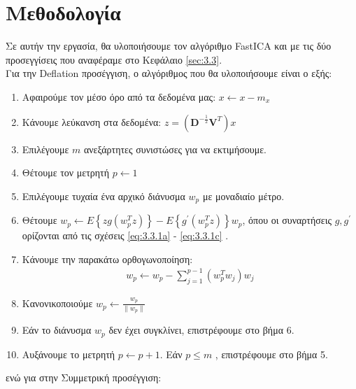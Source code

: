 \section{Μεθοδολογία} \label{sec:3.4}
\justifying
Σε αυτήν την εργασία, θα υλοποιήσουμε τον αλγόριθμο \en FastICA \gr και με τις δύο προσεγγίσεις που αναφέραμε στο Κεφάλαιο
\ref{sec:3.3}. 
\\
Για την \en Deflation \gr προσέγγιση, ο αλγόριθμος που θα υλοποιήσουμε είναι ο εξής:
\begin{enumerate}
    \item Αφαιρούμε τον μέσο όρο από τα δεδομένα μας: \en $x \leftarrow x - m_x $ \gr
    \item Κάνουμε λεύκανση στα δεδομένα: \en $z = \left ( \mathbf{D}^{- \frac{1}{2}} \mathbf{V}^T \right)x $ \gr 
    \item Επιλέγουμε \en $m$ \gr ανεξάρτητες συνιστώσες για να εκτιμήσουμε.
    \item Θέτουμε τον μετρητή \en $p \leftarrow 1$ \gr
    \item Επιλέγουμε τυχαία ένα αρχικό διάνυσμα \en $w_p$ \gr με μοναδιαίο μέτρο.
    \item Θέτουμε \en $w_p \leftarrow E \left \{ z g( w_p^T z) \right \} - E \left \{ g^{'}(w_p^T z) \right \}w_p $, \gr όπου οι συναρτήσεις \en $g, g^{'} $ \gr ορίζονται από τις σχέσεις \en \eqref{eq:3.3.1a} - \eqref{eq:3.3.1c} \gr.
    \item Κάνουμε την παρακάτω ορθογωνοποίηση: \en
    \begin{align*}
        w_p \leftarrow w_p - \sum\limits_{j=1}^{p-1} \left (
        w_p^T w_j\right ) w_j
    \end{align*} \gr
    \item Κανονικοποιούμε \en $w_p \leftarrow \frac{w_p}{\parallel w_p \parallel} $ \gr
    \item Εάν το διάνυσμα \en $w_p$ \gr δεν έχει συγκλίνει, επιστρέφουμε στο βήμα 6.
    \item Αυξάνουμε το μετρητή \en $p \leftarrow p+1 $. \gr  
    Εάν \en $p \leq m$ , \gr επιστρέφουμε στο βήμα 5. 
\end{enumerate} \leavevmode
ενώ για στην Συμμετρική προσέγγιση:
